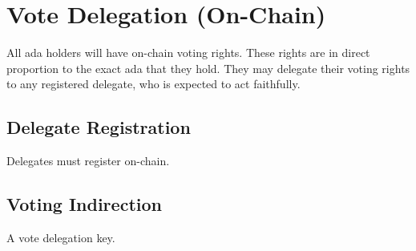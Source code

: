 \section{Vote Delegation (On-Chain)}

All ada holders will have on-chain voting rights.  These rights are in direct proportion to the exact ada that they hold.
They may delegate their voting rights to any registered delegate, who is expected to act faithfully.

\subsection{Delegate Registration}

Delegates must register on-chain.

\subsection{Voting Indirection}

A vote delegation key.
